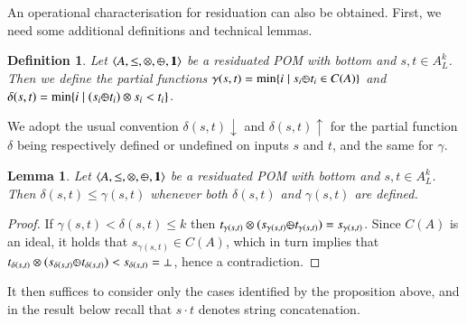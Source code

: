 \documentclass[a4paper]{elsarticle}
\newtheorem{definition}{Definition}
\newtheorem{lemma}{Lemma}
\newcommand{\monop}{\otimes}
\newcommand{\1}{\mathbf{1}}
\def\odiv{{ \ominus\hspace{-8pt}:}\;}
\begin{document}
An operational characterisation for residuation can also be obtained. 
First, we need some additional definitions and technical lemmas.

\begin{definition}
	Let $\langle A, \leq, \monop, \odiv, \1 \rangle$
	be a residuated POM with bottom and $s, t \in A^k_L$. Then 
	we define the partial functions 
	$\gamma(s, t) = \min\{ i \mid s_i \odiv t_i \in C(A)\}$
	and $\delta(s, t) = \min\{ i \mid (s_i \odiv t_i) \otimes s_i < t_i\}$.
\end{definition}

We adopt the usual convention $\delta(s,t){\downarrow}$ and $\delta(s,t){\uparrow}$ for 
the partial function $\delta$ being respectively defined or undefined on inputs $s$ and $t$,
and the same for $\gamma$.


\begin{lemma}\label{limit}
	Let $\langle A, \leq, \monop, \odiv, \1 \rangle$
	be a residuated POM with bottom and $s, t \in A^k_L$. Then 
	$\delta(s,t) \leq \gamma(s,t)$
	whenever both 	$\delta(s,t)$ and $\gamma(s,t)$
	are defined.
\end{lemma}
\begin{proof}
	If $\gamma(s,t) < \delta(s,t) \leq k$ then 
	$t_{\gamma(s,t)} \otimes (s_{\gamma(s,t)} \odiv t_{\gamma(s,t)})  = s_{\gamma(s,t)}$.
	Since $C(A)$ is an ideal, it holds that $s_{\gamma(s,t)} \in C(A)$, 
	which in turn implies that $t_{\delta(s,t)} \otimes (s_{\delta(s,t)} \odiv t_{\delta(s,t)}) < s_{\delta(s,t)} = \bot$,
	hence a contradiction. 
\end{proof}

It then suffices to consider only the cases identified by the proposition above, and
in the result below recall that $s \cdot t$ denotes string concatenation.
\end{document}
